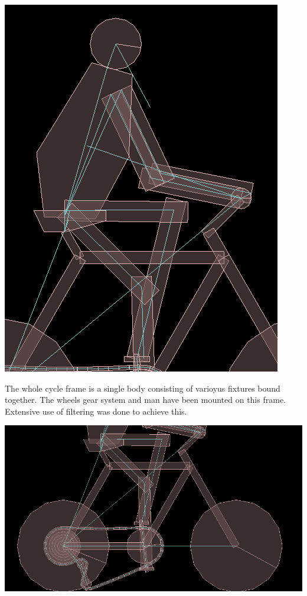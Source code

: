 \documentclass[11pt]{article}
\begin{document}
	 \begin{center}
	\includegraphics[scale=0.4]{pic5}
	\end{center}
The whole cycle frame is a single body consisting of varioyus fixtures bound together. The wheels gear system and man have been mounted on this frame. Extensive use of filtering was done to achieve this.\\	
	\begin{center}
	\includegraphics[scale=0.4]{pic6}
	\end{center}
\end{document}
